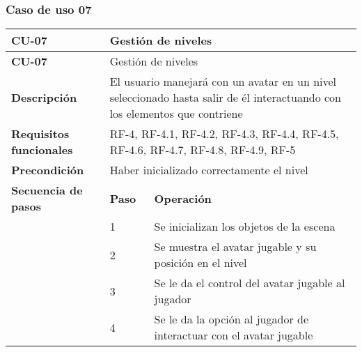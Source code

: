 \subsubsection{Caso de uso 07}
\begin{longtable}{lll}
\textbf{CU-07}                                   & \multicolumn{2}{l}{Gestión de niveles}                                                                                                         \\ \hline
\endfirsthead
\textbf{CU-07}                                   & \multicolumn{2}{l}{Gestión de niveles}                                                                                                         \\ \hline
\endhead
%
\hline
\endfoot
%
\endlastfoot
%
\textbf{Descripción}                             & \multicolumn{2}{l}{El usuario manejará con un avatar en un nivel seleccionado hasta salir de él interactuando con los elementos que contriene} \\ \hline
\textbf{Requisitos funcionales}                  & \multicolumn{2}{l}{RF-4, RF-4.1, RF-4.2, RF-4.3, RF-4.4, RF-4.5, RF-4.6, RF-4.7, RF-4.8, RF-4.9, RF-5}                                         \\ \hline
\textbf{Precondición}                            & \multicolumn{2}{l}{Haber inicializado correctamente el nivel}                                                                                  \\ \hline
\multicolumn{1}{l|}{\textbf{Secuencia de pasos}} & \textbf{Paso}                         & \textbf{Operación}                                                                                     \\ \cline{2-3} 
\multicolumn{1}{l|}{}                            & 1                                     & Se inicializan los objetos de la escena                                                                \\
\multicolumn{1}{l|}{}                            & 2                                     & Se muestra el avatar jugable y su posición en el nivel                                                 \\
\multicolumn{1}{l|}{}                            & 3                                     & Se le da el control del avatar jugable al jugador                                                      \\
\multicolumn{1}{l|}{}                            & 4                                     & Se le da la opción al jugador de interactuar con el avatar jugable                                     \\

\end{longtable}
